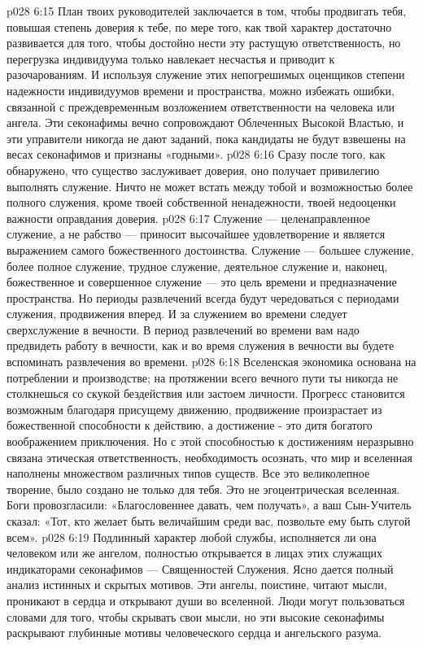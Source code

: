 \vs p028 6:15 \pc План твоих руководителей заключается в том, чтобы продвигать тебя, повышая степень доверия к тебе, по мере того, как твой характер достаточно развивается для того, чтобы достойно нести эту растущую ответственность, но перегрузка индивидуума только навлекает несчастья и приводит к разочарованиям. И используя служение этих непогрешимых оценщиков степени надежности индивидуумов времени и пространства, можно избежать ошибки, связанной с преждевременным возложением ответственности на человека или ангела. Эти секонафимы вечно сопровождают Облеченных Высокой Властью, и эти управители никогда не дают заданий, пока кандидаты не будут взвешены на весах секонафимов и признаны «годными».
\vs p028 6:16 \bibnobreakspace {} Сразу после того, как обнаружено, что существо заслуживает доверия, оно получает привилегию выполнять служение. Ничто не может встать между тобой и возможностью более полного служения, кроме твоей собственной ненадежности, твоей недооценки важности оправдания доверия.
\vs p028 6:17 Служение --- целенаправленное служение, а не рабство --- приносит высочайшее удовлетворение и является выражением самого божественного достоинства. Служение --- большее служение, более полное служение, трудное служение, деятельное служение и, наконец, божественное и совершенное служение --- это цель времени и предназначение пространства. Но периоды развлечений всегда будут чередоваться с периодами служения, продвижения вперед. И за служением во времени следует сверхслужение в вечности. В период развлечений во времени вам надо предвидеть работу в вечности, как и во время служения в вечности вы будете вспоминать развлечения во времени.
\vs p028 6:18 \pc Вселенская экономика основана на потреблении и производстве; на протяжении всего вечного пути ты никогда не столкнешься со скукой бездействия или застоем личности. Прогресс становится возможным благодаря присущему движению, продвижение произрастает из божественной способности к действию, а достижение \hyp{} это дитя богатого воображением приключения. Но с этой способностью к достижениям неразрывно связана этическая ответственность, необходимость осознать, что мир и вселенная наполнены множеством различных типов существ. Все это великолепное творение,  было создано не только для тебя. Это не эгоцентрическая вселенная. Боги провозгласили: «Благословеннее давать, чем получать», а ваш Сын\hyp{}Учитель сказал: «Тот, кто желает быть величайшим среди вас, позвольте ему быть слугой всем».
\vs p028 6:19 \pc Подлинный характер любой службы, исполняется ли она человеком или же ангелом, полностью открывается в лицах этих служащих индикаторами секонафимов --- Священностей Служения. Ясно дается полный анализ истинных и скрытых мотивов. Эти ангелы, поистине, читают мысли, проникают в сердца и открывают души во вселенной. Люди могут пользоваться словами для того, чтобы скрывать свои мысли, но эти высокие секонафимы раскрывают глубинные мотивы человеческого сердца и ангельского разума.
